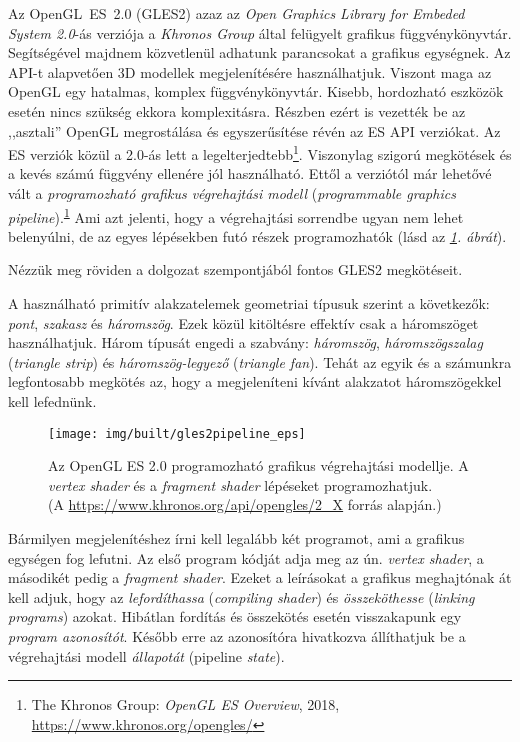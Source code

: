 \documentclass[12pt]{report}
\theoremstyle{definition}
\newcommand{\inenglish}[1]{\textsl{#1}}
\begin{document}
Az OpenGL~ES~2.0 (GLES2) azaz az \emph{Open Graphics Library for Embeded System
2.0}-ás verziója a \emph{Khronos Group} által felügyelt grafikus
függvénykönyvtár.  Segítségével majdnem közvetlenül adhatunk parancsokat a
grafikus egységnek. Az API-t alapvetően 3D modellek megjelenítésére
használhatjuk. Viszont maga az OpenGL egy hatalmas, komplex függvénykönyvtár.
Kisebb, hordozható eszközök esetén nincs szükség ekkora komplexitásra. Részben
ezért is vezették be az ,,asztali'' OpenGL megrostálása és egyszerűsítése révén
az ES API verziókat. Az ES verziók közül a 2.0-ás lett a
legelterjedtebb\footnote{The Khronos Group: \emph{OpenGL ES Overview}, 2018,
\footnotesize{\url{https://www.khronos.org/opengles/}}\label{fn:GLES2}}.
Viszonylag szigorú megkötések és a kevés számú függvény ellenére jól
használható. Ettől a verziótól már lehetővé vált a \emph{programozható grafikus
végrehajtási modell} (\inenglish{programmable graphics
pipeline}).\textsuperscript{\ref{fn:GLES2}} Ami azt jelenti, hogy a végrehajtási
sorrendbe ugyan nem lehet belenyúlni, de az egyes lépésekben futó részek
programozhatók (lásd az \emph{\ref{opengles_20_pipeline2}. ábrát}).

Nézzük meg röviden a dolgozat szempontjából fontos GLES2 megkötéseit.

A használható primitív alakzatelemek geometriai típusuk szerint a következők:
\emph{pont}, \emph{szakasz} és \emph{háromszög}. Ezek közül kitöltésre effektív
csak a háromszöget használhatjuk. Három típusát engedi a szabvány:
\emph{háromszög}, \emph{háromszögszalag} (\inenglish{triangle strip}) és
\emph{háromszög-legyező} (\inenglish{triangle fan}). Tehát az egyik és a
számunkra legfontosabb megkötés az, hogy a megjeleníteni kívánt alakzatot
háromszögekkel kell lefednünk.

  \begin{figure}
    \texttt{[image: img/built/gles2pipeline\_eps]}
    \caption{\label{opengles_20_pipeline2} Az OpenGL ES 2.0 programozható
    grafikus végrehajtási modellje. A \emph{vertex shader} és a \emph{fragment
    shader} lépéseket programozhatjuk. \\%
    (A \footnotesize{\url{https://www.khronos.org/api/opengles/2_X}} forrás
    alapján.)
    }
  \end{figure}

Bármilyen megjelenítéshez írni kell legalább két programot, ami a grafikus
egységen fog lefutni. Az első program kódját adja meg az ún. \emph{vertex
shader}, a másodikét pedig a \emph{fragment shader}. Ezeket a leírásokat a
grafikus meghajtónak át kell adjuk, hogy az \emph{lefordíthassa}
(\inenglish{compiling shader}) és \emph{összeköthesse} (\inenglish{linking
programs}) azokat. Hibátlan fordítás és összekötés esetén visszakapunk egy
\emph{program azonosítót}.  Később erre az azonosítóra hivatkozva állíthatjuk be
a végrehajtási modell \emph{állapotát} (pipeline \inenglish{state}).
\end{document}
